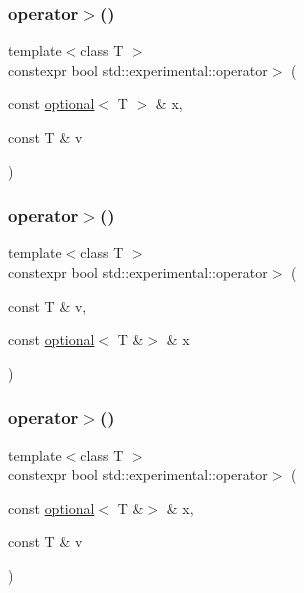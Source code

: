 \mbox{\label{namespacestd_1_1experimental_acd392a8263ad2dd322655078d53e77ad}} 
\subsubsection{\texorpdfstring{operator$>$()}{operator>()}\hspace{0.1cm}{\footnotesize\ttfamily [5/9]}}
{\footnotesize\ttfamily template$<$class T $>$ \\
constexpr bool std\+::experimental\+::operator$>$ (\begin{DoxyParamCaption}\item[{const \mbox{\hyperlink{classstd_1_1experimental_1_1optional}{optional}}$<$ T $>$ \&}]{x,  }\item[{const T \&}]{v }\end{DoxyParamCaption})}

\mbox{\label{namespacestd_1_1experimental_a84d294fc6ef231696e23f6b21f0391aa}} 
\subsubsection{\texorpdfstring{operator$>$()}{operator>()}\hspace{0.1cm}{\footnotesize\ttfamily [6/9]}}
{\footnotesize\ttfamily template$<$class T $>$ \\
constexpr bool std\+::experimental\+::operator$>$ (\begin{DoxyParamCaption}\item[{const T \&}]{v,  }\item[{const \mbox{\hyperlink{classstd_1_1experimental_1_1optional}{optional}}$<$ T \&$>$ \&}]{x }\end{DoxyParamCaption})}

\mbox{\label{namespacestd_1_1experimental_a733d2aa90d49bd113f2420f996e13a8f}} 
\subsubsection{\texorpdfstring{operator$>$()}{operator>()}\hspace{0.1cm}{\footnotesize\ttfamily [7/9]}}
{\footnotesize\ttfamily template$<$class T $>$ \\
constexpr bool std\+::experimental\+::operator$>$ (\begin{DoxyParamCaption}\item[{const \mbox{\hyperlink{classstd_1_1experimental_1_1optional}{optional}}$<$ T \&$>$ \&}]{x,  }\item[{const T \&}]{v }\end{DoxyParamCaption})}

